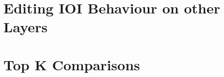\documentclass{article} %
\begin{document}
% 




\section{Editing IOI Behaviour on other Layers}
\label{appendix:ioi_other_layers}


\section{Top K Comparisons}
\label{appendix:topk}



\end{document}
